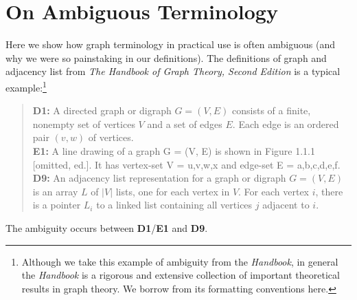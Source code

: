 
\appendix

\section{On Ambiguous Terminology}
\label{sec:ambiguity}

Here we show how graph terminology in practical use is often ambiguous (and why we were so painstaking in our definitions).
The definitions of graph and adjacency list from \emph{The Handbook of Graph Theory, Second Edition} is a typical
example:\footnote{
Although we take this example of ambiguity
from the \emph{Handbook}, in general the \emph{Handbook} is a rigorous and extensive collection of
important theoretical results in graph theory.  We borrow from its formatting conventions here.
}
\begin{quote}
  \textbf{D1:} A directed graph or digraph $G = (V,E)$ consists of a finite, nonempty set of vertices $V$ and a set of edges $E$.
Each edge is an ordered pair $(v,w)$ of vertices.
\\[\medskipamount]
\textbf{E1:} A line drawing of a graph G = (V, E) is shown in Figure 1.1.1 [omitted, ed.]. It has vertex-set V = {u,v,w,x} and
edge-set E = {a,b,c,d,e,f}.
\\[\medskipamount]
\textbf{D9:} An adjacency list representation for a graph or digraph $G = (V, E)$ is an array $L$ of $|V|$ lists, one for each
vertex in $V$. For each vertex $i$, there is a pointer $L_i$ to a linked list containing all vertices $j$ adjacent to $i$.
\end{quote}
The ambiguity occurs between \textbf{D1}/\textbf{E1} and \textbf{D9}.


